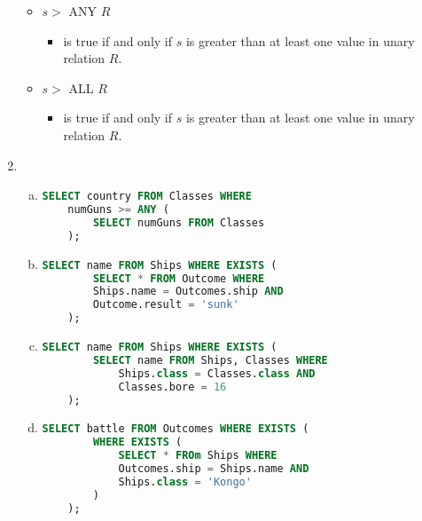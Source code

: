 \documentclass[12pt]{article}
\begin{document}
\begin{enumerate}[1.]
\begin{itemize}
        \item $s >$ ANY $R$
        \begin{itemize}
            \item is true if and only if $s$ is greater than at least one value in
            unary relation $R$.
        \end{itemize}

        \item $s >$ ALL $R$
        \begin{itemize}
            \item is true if and only if $s$ is greater than at least one value in unary
            relation $R$.
        \end{itemize}
    \end{itemize}

    \item

    \begin{enumerate}[a)]

        \item
    \begin{lstlisting}[language=SQL]
    SELECT country FROM Classes WHERE
    numGuns >= ANY (
        SELECT numGuns FROM Classes
    );
    \end{lstlisting}

        \item

    \begin{lstlisting}[language=SQL]
    SELECT name FROM Ships WHERE EXISTS (
        SELECT * FROM Outcome WHERE
        Ships.name = Outcomes.ship AND
        Outcome.result = 'sunk'
    );
    \end{lstlisting}

        \item

    \begin{lstlisting}[language=SQL]
    SELECT name FROM Ships WHERE EXISTS (
        SELECT name FROM Ships, Classes WHERE
            Ships.class = Classes.class AND
            Classes.bore = 16
    );
    \end{lstlisting}

        \item

    \begin{lstlisting}[language=SQL]
    SELECT battle FROM Outcomes WHERE EXISTS (
        WHERE EXISTS (
            SELECT * FROm Ships WHERE
            Outcomes.ship = Ships.name AND
            Ships.class = 'Kongo'
        )
    );
    \end{lstlisting}


\end{enumerate}
\end{enumerate}
\end{document}
